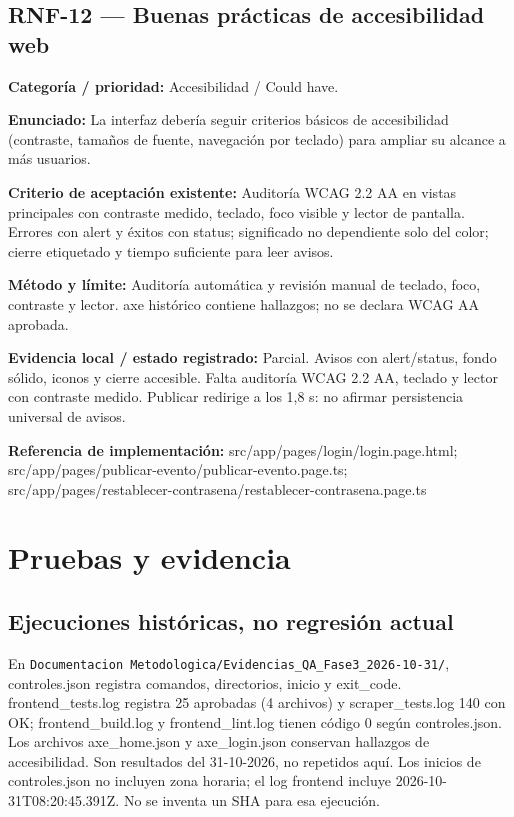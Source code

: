 \subsection{RNF-12 — Buenas prácticas de accesibilidad web}
\textbf{Categoría / prioridad:} Accesibilidad / Could have.\par
\textbf{Enunciado:} La interfaz debería seguir criterios básicos de accesibilidad (contraste, tamaños de fuente, navegación por teclado) para ampliar su alcance a más usuarios.\par
\textbf{Criterio de aceptación existente:} Auditoría WCAG 2.2 AA en vistas principales con contraste medido, teclado, foco visible y lector de pantalla. Errores con alert y éxitos con status; significado no dependiente solo del color; cierre etiquetado y tiempo suficiente para leer avisos.\par
\textbf{Método y límite:} Auditoría automática y revisión manual de teclado, foco, contraste y lector. axe histórico contiene hallazgos; no se declara WCAG AA aprobada.\par
\textbf{Evidencia local / estado registrado:} Parcial. Avisos con alert/status, fondo sólido, iconos y cierre accesible. Falta auditoría WCAG 2.2 AA, teclado y lector con contraste medido. Publicar redirige a los 1,8 s: no afirmar persistencia universal de avisos.\par
\textbf{Referencia de implementación:} src/app/pages/login/login.page.html; src/app/pages/publicar-evento/publicar-evento.page.ts; src/app/pages/restablecer-contrasena/restablecer-contrasena.page.ts\par

\section{Pruebas y evidencia}
\label{sec:pruebas}
\subsection{Ejecuciones históricas, no regresión actual}
En \nolinkurl{Documentacion Metodologica/Evidencias_QA_Fase3_2026-10-31/},
controles.json registra comandos, directorios, inicio y exit\_code. frontend\_tests.log
registra 25 aprobadas (4 archivos) y scraper\_tests.log 140 con OK; frontend\_build.log y
frontend\_lint.log tienen código 0 según controles.json. Los archivos axe\_home.json y
axe\_login.json conservan hallazgos de accesibilidad. Son resultados del 31-10-2026,
no repetidos aquí. Los inicios de controles.json no incluyen zona horaria; el log frontend
incluye 2026-10-31T08:20:45.391Z. No se inventa un SHA para esa ejecución.

